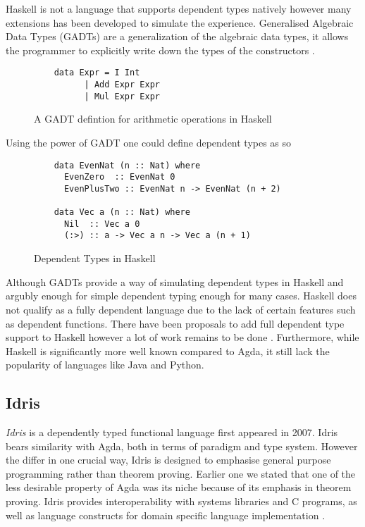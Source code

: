 \documentclass[a4paper,12pt]{report}
\begin{document}
\par
Haskell is not a language that supports dependent types natively however many 
extensions has been developed to simulate the experience. 
Generalised Algebraic Data Types (GADTs) are a generalization of the 
algebraic data types, it allows the programmer to 
explicitly write down the types of the constructors \cite{haskellGADT}. 
\begin{figure}[H]
  \begin{lstlisting}
    data Expr = I Int        
          | Add Expr Expr 
          | Mul Expr Expr 
  \end{lstlisting}
  \caption{A GADT defintion for arithmetic operations in Haskell}
\end{figure}

Using the power of GADT one could define dependent types as so

\begin{figure}[H]
  \begin{lstlisting}      
    data EvenNat (n :: Nat) where
      EvenZero  :: EvenNat 0
      EvenPlusTwo :: EvenNat n -> EvenNat (n + 2)
      
    data Vec a (n :: Nat) where
      Nil  :: Vec a 0
      (:>) :: a -> Vec a n -> Vec a (n + 1)
  \end{lstlisting}
  \caption{Dependent Types in Haskell}
\end{figure}

\par
Although GADTs provide a way of simulating dependent types in Haskell and 
argubly enough for simple dependent typing enough for many cases. 
Haskell does not qualify as a fully dependent 
language due to the lack of certain features such as dependent functions. There 
have been proposals to add full dependent type support to Haskell however a lot 
of work remains to be done \cite{dependentHaskell, aRoleForDependentHaskell}. 
Furthermore, while Haskell is significantly more well known compared to Agda, it 
still lack the popularity of languages like Java and Python.

\subsection{Idris}
\textit{Idris} \cite{idris} is a dependently typed functional language first 
appeared in 2007. Idris bears similarity with Agda, both in terms of paradigm 
and type system. However the differ in one crucial way, Idris is designed to 
emphasise general purpose programming rather than theorem proving. Earlier one 
we stated that one of the less desirable property of Agda was its niche because 
of its emphasis in theorem proving. Idris provides 
interoperability with systems libraries and C programs, 
as well as language constructs for domain specific language 
implementation \cite{gpIdris}. 
\end{document}
